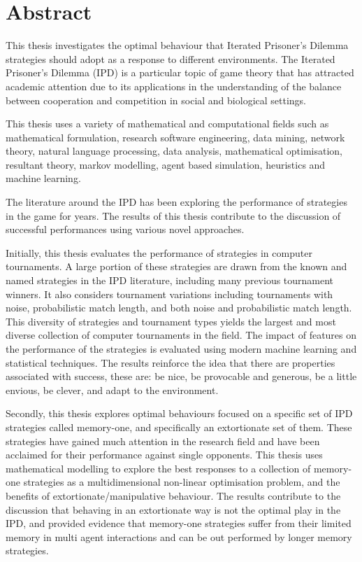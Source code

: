 \chapter{Abstract}

This thesis investigates the optimal behaviour that Iterated Prisoner's Dilemma
strategies should adopt as a response to different environments. The Iterated
Prisoner's Dilemma (IPD) is a particular topic of game theory that has attracted
academic attention due to its applications in the understanding of
the balance between cooperation and competition in social and biological
settings.

This thesis uses a variety of mathematical and computational fields such as
mathematical formulation, research software engineering, data mining, network
theory, natural language processing, data analysis, mathematical
optimisation, resultant theory, markov modelling, agent based simulation,
heuristics and machine learning. %

The literature around the IPD has been exploring the performance of strategies
in the game for years. The results of this thesis contribute to the discussion
of successful performances using various novel approaches.

Initially, this thesis evaluates the performance of \numberofstrategies
strategies in \numberofalltournaments computer tournaments. A large portion of
these strategies are drawn from the known and named strategies in the IPD
literature, including many previous tournament winners. It also
considers tournament variations including tournaments with
noise, probabilistic match length, and both noise and probabilistic match
length. This diversity of strategies and tournament types yields the largest and
most diverse collection of computer tournaments in the field. The impact of
features on the performance of the \numberofstrategies strategies is evaluated
using modern machine learning and statistical techniques. The results reinforce
the idea that there are properties associated with success, these are: be nice,
be provocable and generous, be a little envious, be clever, and adapt to the
environment.

Secondly, this thesis explores optimal behaviours focused on a specific set of
IPD strategies called memory-one, and specifically an
extortionate set of them. These strategies have gained much attention in the
research field and have been acclaimed for their performance against single
opponents. This thesis uses  mathematical modelling to explore the best
responses to a collection of memory-one strategies as a multidimensional non-linear
optimisation problem, and the benefits of extortionate/manipulative
behaviour. The results contribute to the discussion that behaving in an
extortionate way is not the optimal play in the IPD, and provided evidence that
memory-one strategies suffer from their limited memory in multi agent
interactions and can be out performed by longer memory strategies.

